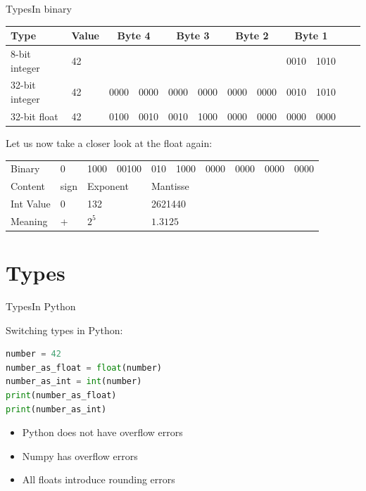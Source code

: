 \documentclass[aspectratio=169]{beamer}
\begin{document}
\begin{frame}{Types}{In binary}
\begin{tabular}{
	ll
	ll
	ll
	ll
	ll
	ll
}
	\toprule
	Type & Value
	&\multicolumn{2}{c}{Byte 4}
	&\multicolumn{2}{c}{Byte 3}
	&\multicolumn{2}{c}{Byte 2}
	&\multicolumn{2}{c}{Byte 1}\\
	\midrule
	8-bit integer & 42
	&&
	&&
	&&
	& 0010 & 1010 \\
	32-bit integer & 42
	& 0000 & 0000
	& 0000 & 0000
	& 0000 & 0000
	& 0010 & 1010 \\
	32-bit float & 42 
	& 0100 & 0010
	& 0010 & 1000
	& 0000 & 0000
	& 0000 & 0000 \\
	\bottomrule
\end{tabular}

\pause
\vspace{2em}
Let us now take a closer look at the float again:
\vspace{1em}

\begin{tabular}{
	l
	lll
	ll
	ll
	ll
}
	\toprule
	Binary
	& 0 
	& 1000 & 00100
	& 010 & 1000
	& 0000 & 0000
	& 0000 & 0000 \\
	\pause
	Content
	& sign  
	&\multicolumn{2}{l}{Exponent}
	&\multicolumn{6}{l}{Mantisse} \\
	\pause
	Int Value 
	& 0
	&\multicolumn{2}{l}{132}
	&\multicolumn{6}{l}{2621440}\\
	\pause
	Meaning
	& +
	& \multicolumn{2}{l}{\begin{math} 2^{5}\end{math}}
	& \multicolumn{6}{l}{\begin{math} 1.3125 \end{math}} \\
	\bottomrule
\end{tabular}
\end{frame}

\section{Types}
\begin{frame}[fragile]{Types}{In Python}

Switching types in Python:

\begin{lstlisting}[language=Python, frame=single]
number = 42
number_as_float = float(number)
number_as_int = int(number)
print(number_as_float)
print(number_as_int)
\end{lstlisting}

\pause
\vspace{2em}
\begin{itemize}
	\item Python does not have overflow errors
	\item Numpy has overflow errors
	\item All floats introduce rounding errors
\end{itemize}

\end{frame}
\end{document}
